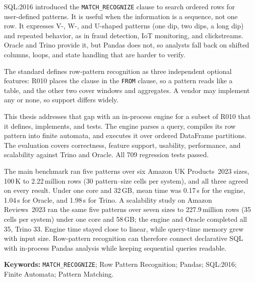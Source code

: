 SQL:2016 introduced the \texttt{MATCH\_RECOGNIZE} clause to search ordered
rows for user-defined patterns.  It is useful when the information is a
sequence, not one row.  It expresses V-, W-, and U-shaped patterns
(one dip, two dips, a long dip) and repeated behavior, as in fraud
detection, IoT monitoring, and clickstreams.
Oracle and Trino provide it, but Pandas does not, so analysts fall back on
shifted columns, loops, and state handling that are harder to verify.

The standard defines row-pattern recognition as three independent optional
features: R010 places the clause in the \texttt{FROM} clause, so a pattern
reads like a table, and the other two cover windows and aggregates.  A
vendor may implement any or none, so
support differs widely.

This thesis addresses that gap with an in-process engine for a subset of
R010 that it defines, implements, and tests.  The engine parses a query,
compiles its row pattern into finite automata, and executes it over ordered
DataFrame partitions.  The evaluation covers correctness, feature
support, usability, performance, and scalability against Trino and Oracle.
All 709 regression tests passed.

The main benchmark ran five patterns over six Amazon UK Products~2023 sizes,
100\,K to 2.22\,million rows (30 pattern--size cells per system), and all
three agreed on
every result.  Under one core and 32\,GB, mean time was
0.17\,s for the engine, 1.04\,s for Oracle, and 1.98\,s for Trino.  A scalability study on Amazon Reviews~2023 ran the same five patterns over
seven sizes to 227.9\,million rows (35 cells per system) under one core and
58\,GB; the engine and Oracle completed all 35, Trino 33.
Engine time stayed close to linear, while query-time memory grew with input size.
Row-pattern recognition can therefore connect declarative SQL with in-process
Pandas analysis while keeping sequential queries readable.

\noindent\textbf{Keywords:} \texttt{MATCH\_RECOGNIZE}; Row Pattern
Recognition; Pandas; SQL:2016; Finite Automata; Pattern Matching.
